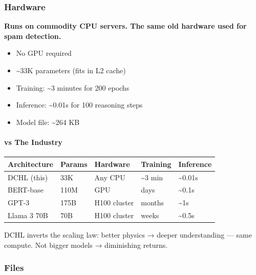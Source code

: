 \documentclass[
  11pt,
  a4paper,
]{article}
\providecommand{\tightlist}{%
  \setlength{\itemsep}{0pt}\setlength{\parskip}{0pt}}
\begin{document}
\subsubsection{Hardware}\label{hardware}

\textbf{Runs on commodity CPU servers. The same old hardware used for
spam detection.}

\begin{itemize}
\tightlist
\item
  No GPU required
\item
  \textasciitilde33K parameters (fits in L2 cache)
\item
  Training: \textasciitilde3 minutes for 200 epochs
\item
  Inference: \textasciitilde0.01s for 100 reasoning steps
\item
  Model file: \textasciitilde264 KB
\end{itemize}

\paragraph{vs The Industry}\label{vs-the-industry}

\begin{longtable}[]{@{}lllll@{}}
\toprule\noalign{}
Architecture & Params & Hardware & Training & Inference \\
\midrule\noalign{}
\endhead
\bottomrule\noalign{}
\endlastfoot
DCHL (this) & 33K & Any CPU & \textasciitilde3 min &
\textasciitilde0.01s \\
BERT-base & 110M & GPU & days & \textasciitilde0.1s \\
GPT-3 & 175B & H100 cluster & months & \textasciitilde1s \\
Llama 3 70B & 70B & H100 cluster & weeks & \textasciitilde0.5s \\
\end{longtable}

DCHL inverts the scaling law: better physics → deeper understanding ---
same compute. Not bigger models → diminishing returns.

\subsubsection{Files}\label{files}
\end{document}
